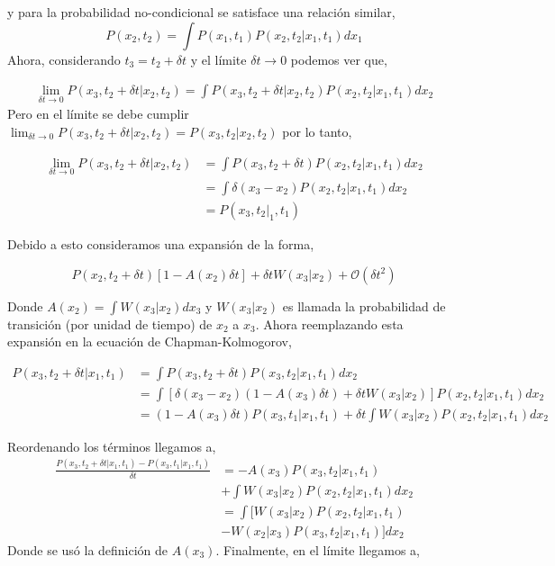 \documentclass[executivepaper,12pt]{article}
\numberwithin{equation}{section}
\begin{document}
y para la probabilidad no-condicional se satisface una relación similar,
\begin{equation*}
	P(x_2,t_2)=\int P(x_1,t_1)P(x_2,t_2\rvert x_1,t_1) dx_1
\end{equation*}
Ahora, considerando $t_3=t_2+\delta t$ y el límite $\delta t \to 0$ podemos ver que,

\begin{align*}
	\lim_{\delta t \to 0}P(x_3,t_2+\delta t \rvert x_2,t_2)=\int P(x_3,t_2+\delta t \rvert x_2, t_2)P(x_2,t_2\rvert x_1,t_1) dx_2
\end{align*}
Pero en el límite se debe cumplir $\lim_{\delta t \to 0}P(x_3,t_2+\delta t \rvert x_2,t_2)=P(x_3,t_2\rvert x_2,t_2)$ por lo tanto,

\begin{align*}
	\lim_{\delta t \to 0}P(x_3,t_2+\delta t \rvert x_2,t_2)&=\int P(x_3,t_2+\delta t)P(x_2,t_2\rvert x_1,t_1)dx_2\\
	&=\int \delta(x_3-x_2)P(x_2,t_2\rvert x_1,t_1)dx_2\\
	&=P(x_3,t_2\rvert_1,t_1)
\end{align*}

Debido a esto consideramos una expansión de la forma,

\begin{equation*}
	P(x_2,t_2+\delta t)\left[1-A(x_2)\delta t\right] +\delta t W(x_3\rvert x_2)+\mathcal{O}(\delta t^2)
\end{equation*}

Donde $A(x_2)=\int W(x_3\rvert x_2)dx_3$ y $W(x_3\rvert x_2)$ es llamada la probabilidad de transición (por unidad de tiempo) de $x_2$ a $x_3$. Ahora reemplazando esta expansión en la ecuación de Chapman-Kolmogorov,

\begin{align*}
	P(x_3,t_2+\delta t\rvert x_1,t_1)&=\int P(x_3,t_2+ \delta t)P(x_3,t_2\rvert x_1,t_1)dx_2\\
	&= \int\left[\delta(x_3-x_2)(1-A(x_3)\delta t)+\delta t W(x_3\rvert x_2)\right]P(x_2,t_2\rvert x_1,t_1) dx_2\\
	&=(1-A(x_3)\delta t)P(x_3,t_1\rvert x_1,t_1)+\delta t \int W(x_3\rvert x_2)P(x_2,t_2\rvert x_1,t_1) dx_2 
\end{align*}

Reordenando los términos llegamos a,
\begin{align*}
	\frac{P(x_3,t_2+\delta t\rvert x_1,t_1) -P(x_3,t_1\rvert 
		x_1,t_1)}{\delta t}&=-A(x_3) P(x_3,t_2\rvert x_1,t_1)\\
	& +\int W(x_3 \rvert x_2) P(x_2,t_2\rvert x_1,t_1) dx_2\\
	&=\int [W(x_3\rvert x_2) P(x_2,t_2\rvert x_1,t_1) \\
	&- W(x_2\rvert x_3)P(x_3,t_2\rvert x_1,t_1)]dx_2
\end{align*}
Donde se usó la definición de $A(x_3)$. Finalmente, en el límite llegamos a,
\end{document}
